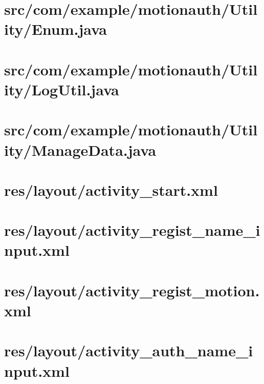 \documentclass[11pt]{jreport}
\renewcommand{\slash}{/}
\begin{document}
    \section{src\slash com\slash example\slash motionauth\slash Utility\slash Enum.java}
    

    \section{src\slash com\slash example\slash motionauth\slash Utility\slash LogUtil.java}
    

    \section{src\slash com\slash example\slash motionauth\slash Utility\slash ManageData.java}
    

    \section{res\slash layout\slash activity\_start.xml}
    

    \section{res\slash layout\slash activity\_regist\_name\_input.xml}
    

    \section{res\slash layout\slash activity\_regist\_motion.xml}
    

    \section{res\slash layout\slash activity\_auth\_name\_input.xml}
    
\end{document}
